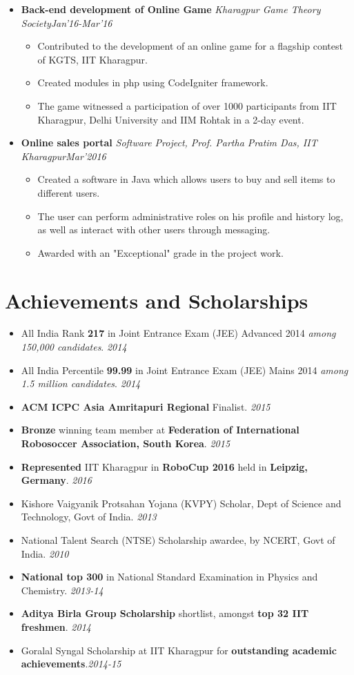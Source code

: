 \documentclass[11pt,a4paper]{moderncv}
\newcommand{\experience}[4]{
  \vspace{0.1cm}
\item \textbf{\large{#1}} \textit{#2}\hfill\textit{#3}
  \begin{itemize}[leftmargin=*]
    \setlength\itemsep{0em} #4
  \end{itemize}
}
\begin{document}
\begin{itemize}
  \experience{Back-end development of Online Game}{Kharagpur Game Theory Society}{Jan'16-Mar'16}{
  \item Contributed to the development of an online game for a flagship contest of KGTS, IIT Kharagpur.
  \item Created modules in php using CodeIgniter framework.
  \item The game witnessed a participation of over 1000 participants from IIT Kharagpur, Delhi University and IIM Rohtak in a 2-day event.
  }

  \experience{Online sales portal}{Software Project, Prof. Partha Pratim Das, IIT Kharagpur}{Mar'2016}{
  \item Created a software in Java which allows users to buy and sell items to different users.
  \item The user can perform administrative roles on his profile and history log, as well as interact with other users through messaging.
  \item Awarded with an "Exceptional" grade in the project work.
  }

\end{itemize}

\vspace{-0.1cm}
\section*{Achievements and Scholarships}
\begin{itemize}
  \setlength\itemsep{0.5em}
\item All India Rank \textbf{217} in Joint Entrance Exam (JEE) Advanced
2014 \textit{among 150,000 candidates}.             \hfill \textit{2014}
\item All India Percentile \textbf{99.99} in Joint Entrance Exam (JEE) Mains 2014 \textit{among 1.5 million candidates}.              \hfill \textit{2014}
\item \textbf{ACM ICPC Asia Amritapuri Regional} Finalist.             \hfill \textit{2015}
\item \textbf{Bronze} winning team member at \textbf{Federation of International Robosoccer Association, South Korea}. \hfill \textit{2015}
\item \textbf{Represented} IIT Kharagpur in \textbf{RoboCup 2016} held in \textbf{Leipzig, Germany}.      \hfill \textit{2016}
\item Kishore Vaigyanik Protsahan Yojana (KVPY) Scholar, Dept of Science and Technology, Govt of India.
  \hfill \textit{2013}
\item National Talent Search (NTSE) Scholarship awardee, by NCERT, Govt of India. \hfill \textit{2010}
\item \textbf{National top 300} in National Standard Examination in Physics and Chemistry. \hfill \textit{2013-14}
\item \textbf{Aditya Birla Group Scholarship} shortlist, amongst \textbf{top 32 IIT freshmen}.      \hfill \textit{2014}
\item Goralal Syngal Scholarship at IIT Kharagpur for \textbf{outstanding academic achievements}.\hfill \textit{2014-15}

\end{itemize}
\end{document}
